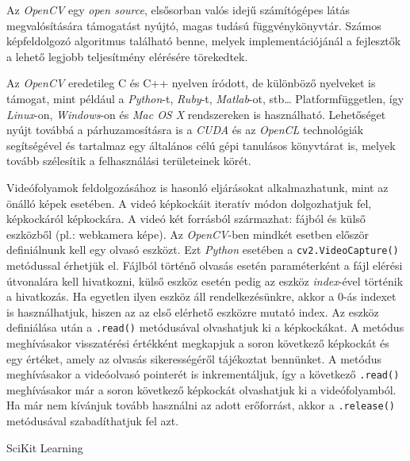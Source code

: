



Az \textit{OpenCV} egy \textit{open source}, elsősorban valós idejű számítógépes látás megvalósítására támogatást nyújtó, magas tudású függvénykönyvtár. Számos képfeldolgozó algoritmus található benne, melyek implementációjánál a fejlesztők a lehető legjobb teljesítmény elérésére törekedtek.

Az \textit{OpenCV} eredetileg C és C++ nyelven íródott, de különböző nyelveket is támogat, mint például a \textit{Python}-t, \textit{Ruby}-t, \textit{Matlab}-ot, stb\ldots
Platformfüggetlen, így \textit{Linux}-on, \textit{Windows}-on és \textit{Mac OS X} rendszereken is használható. Lehetőséget nyújt továbbá a párhuzamosításra is a \textit{CUDA} és az \textit{OpenCL} technológiák segítségével és tartalmaz egy általános célú gépi tanulásos könyvtárat is, melyek tovább szélesítik a felhasználási területeinek körét. \cite{bradski2008learning}

Videófolyamok feldolgozásához is hasonló eljárásokat alkalmazhatunk, mint az önálló képek esetében. A videó képkockáit iteratív módon dolgozhatjuk fel, képkockáról képkockára. A videó két forrásból származhat: fájból és külső eszközből (pl.: webkamera képe). Az \textit{OpenCV}-ben mindkét esetben először definiálnunk kell egy olvasó eszközt. Ezt \textit{Python} esetében a \texttt{cv2.VideoCapture()} metódussal érhetjük el. Fájlból történő olvasás esetén paraméterként a fájl elérési útvonalára kell hivatkozni, külső eszköz esetén pedig az eszköz \textit{index}-ével történik a hivatkozás. Ha egyetlen ilyen eszköz áll rendelkezésünkre, akkor a 0-ás indexet is használhatjuk, hiszen az az első elérhető eszközre mutató index.
Az eszköz definiálása után a \texttt{.read()} metódusával olvashatjuk ki a képkockákat. A metódus meghívásakor visszatérési értékként megkapjuk a soron következő képkockát és egy értéket, amely az olvasás sikerességéről tájékoztat bennünket. A metódus meghívásakor a videóolvasó pointerét is inkrementáljuk, így a következő \texttt{.read()} meghívásakor már a soron következő képkockát olvashatjuk ki a videófolyamból. Ha már nem kívánjuk tovább használni az adott erőforrást, akkor a \texttt{.release()} metódusával szabadíthatjuk fel azt.


SciKit Learning
